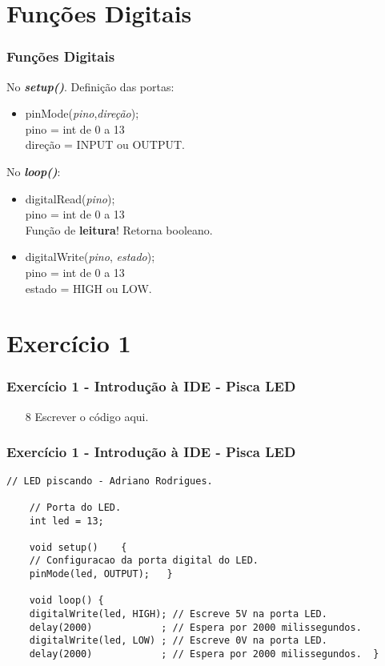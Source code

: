 \documentclass{beamer}
\begin{document}
\section{Funções Digitais}
\begin{frame}
	\frametitle{Funções Digitais}
	No \textit{\textbf{setup()}}. Definição das portas:
	\begin{itemize}
		\item pinMode(\textit{pino},\textit{direção});\\
		pino = int de 0 a 13\\
		direção = INPUT ou OUTPUT.
	\end{itemize}
	No \textit{\textbf{loop()}}:
	\begin{itemize}
		\item digitalRead(\textit{pino});\\
		pino = int de 0 a 13\\
		Função de \textbf{leitura}! Retorna booleano.
		\item digitalWrite(\textit{pino}, \textit{estado});\\
		pino = int de 0 a 13\\
		estado = HIGH ou LOW.
	\end{itemize}
\end{frame}

\section{Exercício 1}
\begin{frame}
	\frametitle{Exercício 1 - Introdução à IDE - Pisca LED}
	\begin{center}
	\end{center}
	\begin{itemize}

		\item[8] Escrever o código aqui.
	\end{itemize}
\end{frame}

\begin{frame}[fragile]
	\frametitle{Exercício 1 - Introdução à IDE - Pisca LED}

	\begin{lstlisting}[style=Arduino,basicstyle=\scriptsize \ttfamily]
	// LED piscando - Adriano Rodrigues.

	// Porta do LED.
	int led = 13;

	void setup()	{
	// Configuracao da porta digital do LED.
	pinMode(led, OUTPUT);	}

	void loop()	{
	digitalWrite(led, HIGH); // Escreve 5V na porta LED.
	delay(2000)            ; // Espera por 2000 milissegundos.
	digitalWrite(led, LOW) ; // Escreve 0V na porta LED.
	delay(2000)            ; // Espera por 2000 milissegundos.	} \end{lstlisting}
\end{frame}
\end{document}
